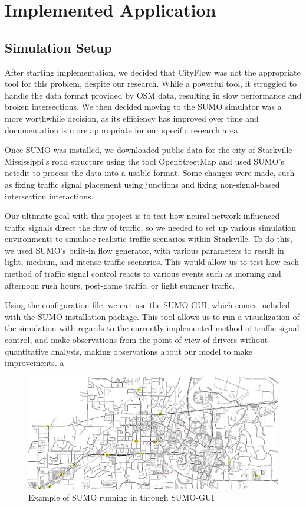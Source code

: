 \documentclass[conference]{IEEEtran}
\begin{document}
\section{Implemented Application}

\subsection{Simulation Setup}

After starting implementation, we decided that CityFlow was not the appropriate tool for this problem, despite our research. While a powerful tool, it struggled to handle the data format provided by OSM data, resulting in slow performance and broken intersections. We then decided moving to the SUMO simulator was a more worthwhile decision, as its efficiency has improved over time and documentation is more appropriate for our specific research area. 

Once SUMO was installed, we downloaded public data for the city of Starkville Mississippi's road structure using the tool OpenStreetMap and used SUMO's netedit to process the data into a usable format. Some changes were made, such as fixing traffic signal placement using junctions and fixing non-signal-based intersection interactions. 

Our ultimate goal with this project is to test how neural network-influenced traffic signals direct the flow of traffic, so we needed to set up various simulation environments to simulate realistic traffic scenarios within Starkville. To do this, we used SUMO's built-in flow generator, with various parameters to result in light, medium, and intense traffic scenarios. This would allow us to test how each method of traffic signal control reacts to various events such as morning and afternoon rush hours, post-game traffic, or light summer traffic. 

Using the configuration file, we can use the SUMO GUI, which comes included with the SUMO installation package. This tool allows us to run a visualization of the simulation with regards to the currently implemented method of traffic signal control, and make observations from the point of view of drivers without quantitative analysis, making observations about our model to make improvements. a

\begin{figure}[H]
    \centering
    \includegraphics[width=0.9\linewidth]{SUMO_RUNNING.png}
    \caption{Example of SUMO running in through SUMO-GUI}
\end{figure}
\end{document}
